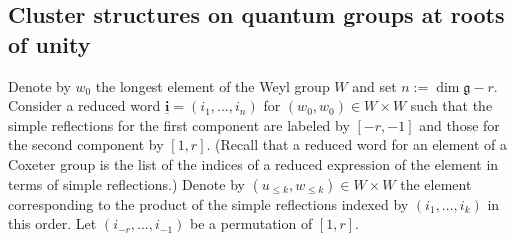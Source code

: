 \documentclass[11pt]{amsart}
\theoremstyle{plain}
\newcommand{\ubi}{\underline{\mathbf{i}}}
\def \g  {\mathfrak{g}}   %
\begin{document}
\subsection{Cluster structures on quantum groups at roots of unity}
\label{qg-cluster}
Denote by $w_0$ the longest element of the Weyl group $W$ and set $n:= \dim \g - r$. Consider a reduced word $\ubi=(i_1,\ldots,i_n)$ for $(w_0,w_0) \in W \times W$ such that the simple reflections for the first component are labeled by $[-r,-1]$ and those for the second component by $[1,r]$. (Recall that a reduced word for an element of a Coxeter group is the list of the indices of a reduced expression of the element in terms of simple reflections.) 
Denote by $(u_{\leq k},w_{\leq k})\in W\times W$ the element corresponding to the product of the simple reflections indexed by $(i_1,\ldots,i_k)$ in this order. Let $(i_{-r},\ldots,i_{-1})$ be a permutation of $[1,r]$. 
\end{document}
